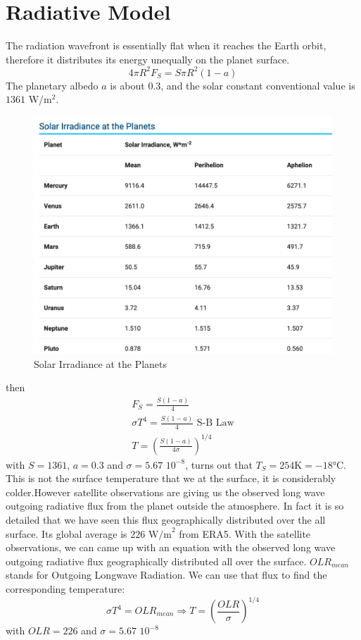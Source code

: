 \section{Radiative Model}
The radiation wavefront is essentially flat when it reaches the Earth orbit, therefore it distributes its energy unequally on the planet surface.
\begin{equation}\label{e.radiation}
	4\pi R^2F_S=S\pi R^2(1-a)
\end{equation}
The planetary albedo $a$ is about $0.3$, and the solar constant conventional value is $1361$ W/m$^2$.
\begin{figure}[h!]
	\centering
	\includegraphics[width=0.5\linewidth]{uploads/Screenshot 2024-11-19 154224.png}
	\caption{Solar Irradiance at the Planets}
	\label{fig:enter-label}
\end{figure}
then
\begin{align*}
	F_S=\frac{S(1-a)}{4}                            \\
	\sigma T^4= \frac{S(1-a)}{4} \,\,\text{S-B Law} \\
	T=\left(\frac{S(1-a)}{4\sigma}\right)^{1/4}
\end{align*}
with $S=1361$, $a=0.3$ and $\sigma=5.67 \, \, 10^{-8}$, turns out that $T_S=254\text{K}=-18°\text{C}$. This is not the surface temperature that we at the surface, it is considerably colder.However satellite observations are giving us the observed long wave outgoing radiative flux
from the planet outside the atmosphere. In fact it is so detailed that we have seen this flux geographically distributed over the all surface. Its global average is $226\, \, \text{W/m}^2$ from ERA5. With the satellite observations, we can came up with an equation with the observed long wave outgoing radiative flux geographically distributed all over the surface. $OLR_{mean}$ stands for Outgoing Longwave Radiation.
We can use that flux to find the corresponding temperature:
$$\sigma T^4=OLR_{mean}\Longrightarrow T=\left(\frac{OLR}{\sigma}\right)^{1/4}$$
with $OLR=226$ and $\sigma=5.67 \,\, 10^{-8}$
